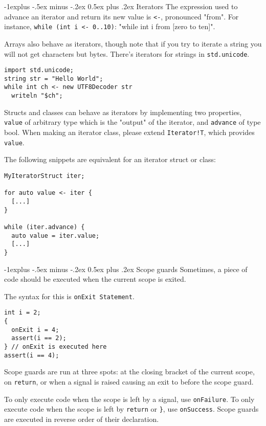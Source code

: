 \documentclass[a4paper,10pt,landscape]{article}
\makeatletter
\newenvironment{segment}[1]
{\begin{mdframed}[roundcorner=5pt]\subsection{#1}}
{\end{mdframed}\vspace{2pt plus 5pt}}
\renewcommand{\subsection}{\@startsection{subsection}{2}{0mm}%
			      {-1explus -.5ex minus -.2ex}%
			      {0.5ex plus .2ex}%
			      {\normalfont\normalsize\bfseries}}
\makeatother
\begin{document}
\begin{multicols}{3}
\begin{segment}{Iterators}
The expression used to advance an iterator and return its new value is \texttt{<-}, pronounced
"from". For instance, \texttt{while (int i <- 0..10)}: "while int i from [zero to ten]".

Arrays also behave as iterators, though note that if you try to iterate a string you will not get characters but bytes.
There's iterators for strings in \texttt{std.unicode}.

\begin{lstlisting}
import std.unicode;
string str = "Hello World";
while int ch <- new UTF8Decoder str
  writeln "$ch";
\end{lstlisting}

Structs and classes can behave as iterators by implementing two properties, \texttt{value}
of arbitrary type which is the "output" of the iterator, and \texttt{advance} of
type bool. When making an iterator class, please extend \texttt{Iterator!T}, which provides \texttt{value}.

The following snippets are equivalent for an iterator struct or class:
\begin{lstlisting}
MyIteratorStruct iter;

for auto value <- iter {
  [...]
}

while (iter.advance) {
  auto value = iter.value;
  [...]
}
\end{lstlisting}
\end{segment}

\begin{segment}{Scope guards}
Sometimes, a piece of code should be executed when the current scope is exited.

The syntax for this is \texttt{onExit Statement}.

\begin{lstlisting}
int i = 2;
{
  onExit i = 4;
  assert(i == 2);
} // onExit is executed here
assert(i == 4);
\end{lstlisting}

Scope guards are run at three spots: at the closing bracket of the current scope, on \texttt{return},
or when a signal is raised causing an exit to before the scope guard.

To only execute code when the scope is left by a signal, use \texttt{onFailure}. To only execute code
when the scope is left by \texttt{return} or \texttt{\}}, use \texttt{onSuccess}. Scope guards
are executed in reverse order of their declaration.

\end{segment}


\end{multicols}
\end{document}
